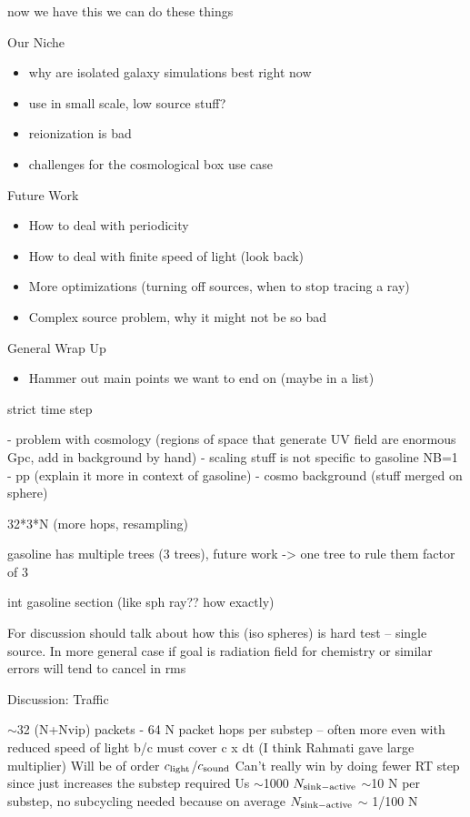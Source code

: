 \documentclass[fleq,usenatbib]{mnras}
\begin{document}
now we have this we can do these things

\noindent Our Niche
\begin{itemize}
\item why are isolated galaxy simulations best right now
\item use in small scale, low source stuff?
\item reionization is bad
\item challenges for the cosmological box use case 
\end{itemize}

\noindent Future Work
\begin{itemize}
\item How to deal with periodicity
\item How to deal with finite speed of light (look back)
\item More optimizations (turning off sources, when to stop tracing a ray)
\item Complex source problem, why it might not be so bad
\end{itemize}

\noindent General Wrap Up
\begin{itemize}
\item Hammer out main points we want to end on (maybe in a list)
\end{itemize}

strict time step

- problem with cosmology (regions of space that generate UV field are 
enormous Gpc, add in background by hand)
- scaling stuff is not specific to gasoline NB=1
- pp (explain it more in context of gasoline)
- cosmo background (stuff merged on sphere)

32*3*N (more hops, resampling)

gasoline has multiple trees (3 trees), future work -> one tree to rule them 
factor of 3

int gasoline section (like sph ray?? how exactly)

For discussion should talk about how this (iso spheres) is hard test -- single 
source.  In more general case if goal is radiation field for chemistry or 
similar errors will tend to cancel in rms

Discussion:   Traffic

$\sim$32 (N+Nvip) packets
- 64 N packet hops per substep 
-- often more even with reduced speed of light b/c must cover c x dt 
(I think Rahmati gave large multiplier)
Will be of order $c_{\rm light}$/$c_{\rm sound}$
Can't really win by doing fewer RT step since just increases the substep 
required
Us $\sim$1000 $N_{\rm sink-active}$ $\sim$10 N per substep, no subcycling needed because on average $N_{\rm sink-active}$ $\sim$ 1/100 N
\end{document}
